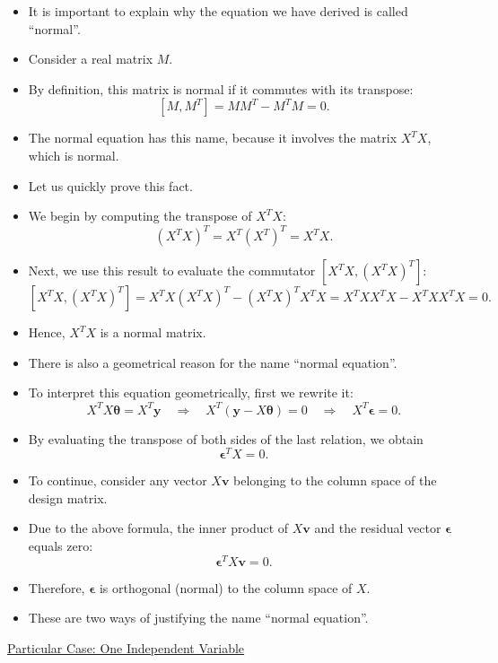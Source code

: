 \documentclass[10pt,american]{scrartcl}
\begin{document}
\begin{itemize}
\item It is important to explain why the equation we have derived is called
``normal''.
\item Consider a real matrix $M$.
\item By definition, this matrix is normal if it commutes with its transpose:
\[
\left[M,M^{T}\right]=MM^{T}-M^{T}M=0.
\]
\item The normal equation has this name, because it involves the matrix
$X^{T}X$, which is normal.
\item Let us quickly prove this fact.
\item We begin by computing the transpose of $X^{T}X$:
\[
\left(X^{T}X\right)^{T}=X^{T}\left(X^{T}\right)^{T}=X^{T}X.
\]
\item Next, we use this result to evaluate the commutator $\left[X^{T}X,\left(X^{T}X\right)^{T}\right]$:
\[
\left[X^{T}X,\left(X^{T}X\right)^{T}\right]=X^{T}X\left(X^{T}X\right)^{T}-\left(X^{T}X\right)^{T}X^{T}X=X^{T}XX^{T}X-X^{T}XX^{T}X=0.
\]
\item Hence, $X^{T}X$ is a normal matrix.
\item There is also a geometrical reason for the name ``normal equation''.
\item To interpret this equation geometrically, first we rewrite it:
\[
X^{T}X\boldsymbol{\theta}=X^{T}\mathbf{y}\quad\Rightarrow\quad X^{T}\left(\mathbf{y}-X\boldsymbol{\theta}\right)=0\quad\Rightarrow\quad X^{T}\boldsymbol{\epsilon}=0.
\]
\item By evaluating the transpose of both sides of the last relation, we
obtain
\[
\boldsymbol{\epsilon}^{T}X=0.
\]
\item To continue, consider any vector $X\mathbf{v}$ belonging to the column
space of the design matrix.
\item Due to the above formula, the inner product of $X\mathbf{v}$ and
the residual vector $\boldsymbol{\epsilon}$ equals zero:
\[
\boldsymbol{\epsilon}^{T}X\mathbf{v}=0.
\]
\item Therefore, $\boldsymbol{\epsilon}$ is orthogonal (normal) to the
column space of $X$.
\item These are two ways of justifying the name ``normal equation''.
\end{itemize}
\uline{Particular Case: One Independent Variable}
\end{document}

